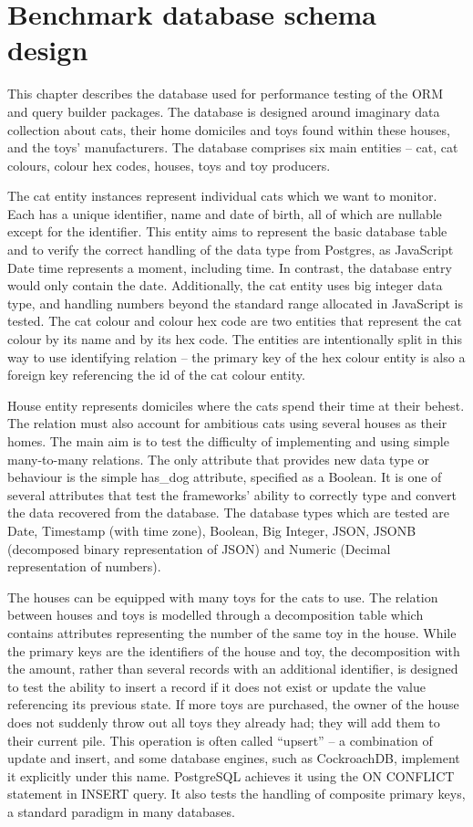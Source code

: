 \chapter{Benchmark database schema design}

This chapter describes the database used for performance testing of the ORM and
query builder packages. The database is designed around imaginary data
collection about cats, their home domiciles and toys found within these houses,
and the toys’ manufacturers. The database comprises six main entities – cat, cat
colours, colour hex codes, houses, toys and toy producers.

The cat entity instances represent individual cats which we want to monitor.
Each has a unique identifier, name and date of birth, all of which are nullable
except for the identifier. This entity aims to represent the basic database
table and to verify the correct handling of the data type from Postgres, as
JavaScript Date time represents a moment, including time. In contrast, the
database entry would only contain the date. Additionally, the cat entity uses
big integer data type, and handling numbers beyond the standard range allocated
in JavaScript is tested. The cat colour and colour hex code are two entities
that represent the cat colour by its name and by its hex code. The entities are
intentionally split in this way to use identifying relation – the primary key of
the hex colour entity is also a foreign key referencing the id of the cat colour
entity. 

House entity represents domiciles where the cats spend their time at their
behest. The relation must also account for ambitious cats using several houses
as their homes. The main aim is to test the difficulty of implementing and using
simple many-to-many relations. The only attribute that provides new data type or
behaviour is the simple has\_dog attribute, specified as a Boolean. It is one of
several attributes that test the frameworks’ ability to correctly type and
convert the data recovered from the database. The database types which are
tested are Date, Timestamp (with time zone), Boolean, Big Integer, JSON, JSONB
(decomposed binary representation of JSON) and Numeric (Decimal representation
of numbers). 

The houses can be equipped with many toys for the cats to use. The relation
between houses and toys is modelled through a decomposition table which contains
attributes representing the number of the same toy in the house. While the
primary keys are the identifiers of the house and toy, the decomposition with
the amount, rather than several records with an additional identifier, is
designed to test the ability to insert a record if it does not exist or update
the value referencing its previous state. If more toys are purchased, the owner
of the house does not suddenly throw out all toys they already had; they will
add them to their current pile. This operation is often called “upsert” – a
combination of update and insert, and some database engines, such as
CockroachDB, implement it explicitly under this name. PostgreSQL achieves it
using the ON CONFLICT statement in INSERT query. It also tests the handling of
composite primary keys, a standard paradigm in many databases. 

